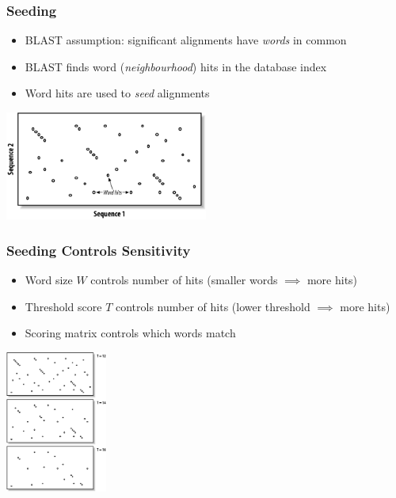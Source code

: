 \documentclass[table]{beamer}
\begin{document}
  \begin{frame}
    \frametitle{Seeding}
    \begin{itemize}
      \item BLAST assumption: significant alignments have \emph{words} in common
      \item BLAST finds word (\emph{neighbourhood}) hits in the database index
      \item Word hits are used to \textit{seed} alignments
    \end{itemize}
    \begin{center}
      \includegraphics[width=0.5\textwidth]{images/seeding} 
    \end{center}    
  \end{frame}

  \begin{frame}
    \frametitle{Seeding Controls Sensitivity}
    \begin{itemize}
      \item Word size $W$ controls number of hits (smaller words $\implies$ more hits)
      \item Threshold score $T$ controls number of hits (lower threshold $\implies$ more hits)
      \item Scoring matrix controls which words match
    \end{itemize}
    \begin{center}
      \includegraphics[width=0.25\textwidth]{images/seeding_t} 
    \end{center}    
  \end{frame}
\end{document}
